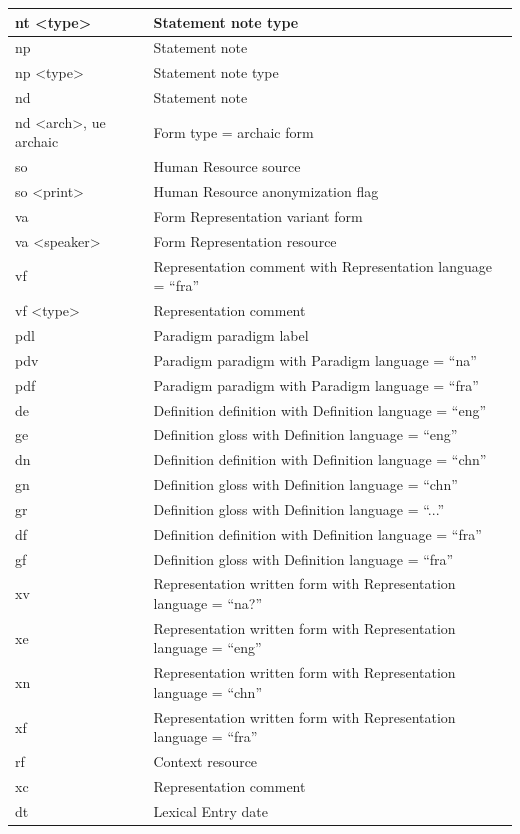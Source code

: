 \documentclass[a4paper,12pt]{article}
\begin{document}
\begin{center}
\begin{longtable}{|p{4cm}|p{11cm}|}
nt \textless type\textgreater & Statement note type \\ \hline
np & Statement note \\ \hline
np \textless type\textgreater & Statement note type \\ \hline
nd & Statement note \\ \hline
nd \textless arch\textgreater, ue archaic & Form type = archaic form \\ \hline
so & Human Resource source \\ \hline
so \textless print\textgreater & Human Resource anonymization flag \\ \hline
va & Form Representation variant form \\ \hline
va \textless speaker\textgreater & Form Representation resource \\ \hline
vf & Representation comment with Representation language = ``fra''  \\ \hline
vf \textless type\textgreater & Representation comment \\ \hline
pdl & Paradigm paradigm label \\ \hline
pdv & Paradigm paradigm with Paradigm language = ``na'' \\ \hline
pdf & Paradigm paradigm with Paradigm language = ``fra'' \\ \hline
de & Definition definition with Definition language = ``eng'' \\ \hline
ge & Definition gloss with Definition language = ``eng'' \\ \hline
dn & Definition definition with Definition language = ``chn'' \\ \hline
gn & Definition gloss with Definition language = ``chn'' \\ \hline
gr & Definition gloss with Definition language = ``...'' \\ \hline
df & Definition definition with Definition language = ``fra'' \\ \hline
gf & Definition gloss with Definition language = ``fra'' \\ \hline
xv & Representation written form with Representation language = ``na?'' \\ \hline
xe & Representation written form with Representation language = ``eng'' \\ \hline
xn & Representation written form with Representation language = ``chn'' \\ \hline
xf & Representation written form with Representation language = ``fra'' \\ \hline
rf & Context resource \\ \hline
xc & Representation comment \\ \hline
dt & Lexical Entry date \\ \hline
\end{longtable}
\end{center}
\end{document}
